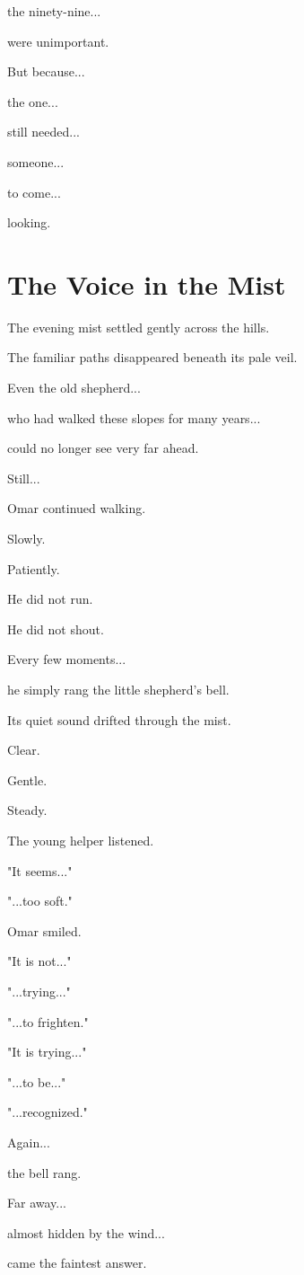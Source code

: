 \documentclass[12pt,openany]{book}
\begin{document}
the ninety-nine...

were unimportant.

But because...

the one...

still needed...

someone...

to come...

looking.
\section*{The Voice in the Mist}

The evening mist settled gently across the hills.

The familiar paths disappeared beneath its pale veil.

Even the old shepherd...

who had walked these slopes for many years...

could no longer see very far ahead.

Still...

Omar continued walking.

Slowly.

Patiently.

He did not run.

He did not shout.

Every few moments...

he simply rang the little shepherd's bell.

Its quiet sound drifted through the mist.

Clear.

Gentle.

Steady.

The young helper listened.

"It seems..."

"...too soft."

Omar smiled.

"It is not..."

"...trying..."

"...to frighten."

"It is trying..."

"...to be..."

"...recognized."

Again...

the bell rang.

Far away...

almost hidden by the wind...

came the faintest answer.
\end{document}
